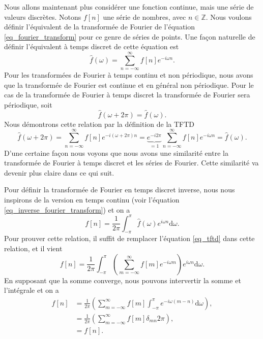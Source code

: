 \documentclass[a4paper,12pt]{book}
\newcommand{\integer}{\mathbb{Z}}
\newcommand{\dd}{\mathrm{d}}
\newcommand{\fh}{\hat{f}}
\begin{document}
Nous allons maintenant plus considérer une fonction continue, mais une série de valeurs discrètes.
Notons $f[n]$ une série de nombres, avec $n\in\integer$. Nous voulons définir l'équivalent de la transformée 
de Fourier de l'équation \eqref{eq_fourier_transform} pour ce genre de séries de points. Une façon naturelle 
de définir l'équivalent à temps discret de cette équation est 
\begin{equation}
 \fh(\omega)=\sum_{n=-\infty}^\infty f[n] e^{-i\omega n}.\label{eq_tftd}
\end{equation}
Pour les transformées de Fourier à temps continu et non périodique, nous avons que la transformée de Fourier
est continue et en général non périodique. Pour le cas de la transformée de Fourier à temps discret
la transformée de Fourier sera périodique, soit
\begin{equation}
 \fh(\omega+2\pi)=\fh(\omega).
\end{equation}
Nous démontrons cette relation par la définition de la TFTD
\begin{equation}
 \fh(\omega+2\pi)=\sum_{n=-\infty}^\infty f[n] e^{-i(\omega+2\pi) n}=\underbrace{e^{-i2\pi}}_{=1}\sum_{n=-\infty}^\infty f[n] e^{-i\omega n}=\fh(\omega).
\end{equation}
D'une certaine façon nous voyons que nous avons une similarité entre la transformée de Fourier à temps discret et les séries de Fourier.
Cette similarité va devenir plus claire dans ce qui suit.

Pour définir la transformée de Fourier en temps discret inverse, nous nous inspirons de la version
en temps continu (voir l'équation \eqref{eq_inverse_fourier_transform}) et on a 
\begin{equation}
 f[n]=\frac{1}{2\pi}\int_{-\pi}^\pi\fh(\omega)e^{i\omega n}\dd \omega. \label{eq_tftdi}
\end{equation}
Pour prouver cette relation, il suffit de remplacer l'équation \eqref{eq_tftd} dans cette relation,
et il vient
\begin{equation}
 f[n]=\frac{1}{2\pi}\int_{-\pi}^\pi \left(\sum_{m=-\infty}^\infty f[m] e^{-i\omega m}\right) e^{i\omega n}\dd \omega.
\end{equation}
En supposant que la somme converge, nous pouvons intervertir la somme et l'intégrale et on a
\begin{align}
 f[n]&=\frac{1}{2\pi}\left(\sum_{m=-\infty}^\infty f[m] \int_{-\pi}^\pi e^{-i\omega (m-n)} \dd \omega\right),\nonumber\\
     &=\frac{1}{2\pi}\left(\sum_{m=-\infty}^\infty f[m] \delta_{mn} 2\pi\right),\nonumber\\
     &=f[n].\nonumber
\end{align}
\end{document}
